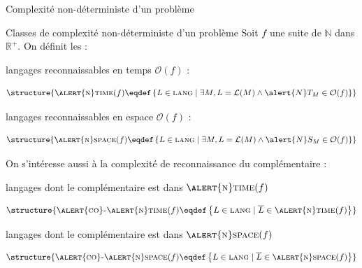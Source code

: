 
\begingroup

\begin{frame}{Complexité non-déterministe d'un problème}

  \begin{block}{Classes de complexité \alert{non-déterministe} d'un problème}
    Soit $f$ une suite de $\mathbb{N}$ dans $\mathbb{R}^+$. 
    On définit les  : 
    \begin{description}
    \item[$\textsc{\alert{n}time}(f)$ :] langages reconnaissables en temps $\mathcal{O}(f)$  :
      
      \vspace{-2mm}
      $$\structure{\textsc{\alert{n}time}(f) \eqdef \left\{L \in \textsc{lang} \mid \exists M, L = \mathcal{L}(M) \land \alert{N}T_M \in \mathcal{O}(f) \right\}}$$
    \item[$\textsc{\alert{n}space}(f)$ :] langages reconnaissables en espace $\mathcal{O}(f)$  :

      \vspace{-2mm}
      $$\structure{\textsc{\alert{n}space}(f) \eqdef \left\{L \in \textsc{lang} \mid \exists M, L = \mathcal{L}(M) \land \alert{N}S_M \in \mathcal{O}(f) \right\}}$$
    \end{description}

    On s'intéresse aussi à la complexité de reconnaissance du complémentaire :
    \begin{description}
    \item[$\textsc{\alert{co}-\alert{n}time}(f)$ :] langages dont le complémentaire est dans $\textsc{\alert{n}time}(f)$
      
      \vspace{-2mm}
      $$\structure{\textsc{\alert{co}-\alert{n}time}(f) \eqdef \left\{L \in \textsc{lang} \mid \overline{L} \in \textsc{\alert{n}time}(f)\right\}}$$

    \item[$\textsc{\alert{co}-\alert{n}space}(f)$ :] langages dont le complémentaire est dans $\textsc{\alert{n}space}(f)$
      
      \vspace{-2mm}
      $$\structure{\textsc{\alert{co}-\alert{n}space}(f) \eqdef \left\{L \in \textsc{lang} \mid \overline{L} \in \textsc{\alert{n}space}(f)\right\}}$$
    \end{description}
  \end{block}

\end{frame}

\endgroup
\endinput
